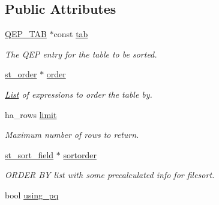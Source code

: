 \subsection*{Public Attributes}
\begin{DoxyCompactItemize}
\item 
\mbox{\label{classFilesort_a00dd6a20503a0eab39f2c9eb8bf421ea}} 
\mbox{\hyperlink{classQEP__TAB}{Q\+E\+P\+\_\+\+T\+AB}} $\ast$const \mbox{\hyperlink{classFilesort_a00dd6a20503a0eab39f2c9eb8bf421ea}{tab}}
\begin{DoxyCompactList}\small\item\em The Q\+EP entry for the table to be sorted. \end{DoxyCompactList}\item 
\mbox{\label{classFilesort_ac811beea21279e6cccf453241fe51e51}} 
\mbox{\hyperlink{structst__order}{st\+\_\+order}} $\ast$ \mbox{\hyperlink{classFilesort_ac811beea21279e6cccf453241fe51e51}{order}}
\begin{DoxyCompactList}\small\item\em \mbox{\hyperlink{classList}{List}} of expressions to order the table by. \end{DoxyCompactList}\item 
\mbox{\label{classFilesort_a6150bb39d6fe146d40d27101771618cb}} 
ha\+\_\+rows \mbox{\hyperlink{classFilesort_a6150bb39d6fe146d40d27101771618cb}{limit}}
\begin{DoxyCompactList}\small\item\em Maximum number of rows to return. \end{DoxyCompactList}\item 
\mbox{\label{classFilesort_a1dbd5af6a2fd7666dd5df3c9760bd152}} 
\mbox{\hyperlink{structst__sort__field}{st\+\_\+sort\+\_\+field}} $\ast$ \mbox{\hyperlink{classFilesort_a1dbd5af6a2fd7666dd5df3c9760bd152}{sortorder}}
\begin{DoxyCompactList}\small\item\em O\+R\+D\+ER BY list with some precalculated info for filesort. \end{DoxyCompactList}\item 
\mbox{\label{classFilesort_a4a5d09c1f56508024a7182dd84fd258d}} 
bool \mbox{\hyperlink{classFilesort_a4a5d09c1f56508024a7182dd84fd258d}{using\+\_\+pq}}

\end{DoxyCompactItemize}
